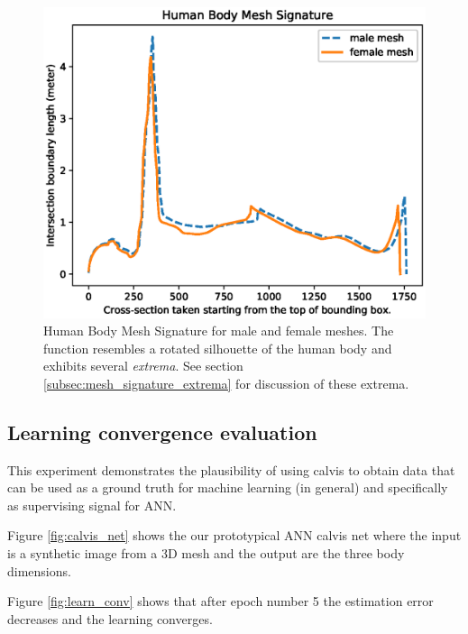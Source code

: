 \documentclass[runningheads, orivec]{llncs}
\begin{document}
\begin{figure}[h!]
	\begin{center}
		\includegraphics[width=\linewidth]{Figure_1.eps}
	\end{center}
	\caption{Human Body Mesh Signature for male and female meshes. The 
		function resembles a rotated silhouette of the human body and exhibits 
		several \textit{extrema}. See section 
		\ref{subsec:mesh_signature_extrema} for discussion of these extrema.}
	\label{fig:qualitative_eval}
\end{figure}

\subsection{Learning convergence evaluation}\label{subsec:learn_conv}
This experiment demonstrates the plausibility of using calvis to obtain data 
that can be used as a ground truth for machine learning (in general) and 
specifically as supervising signal for ANN.

Figure \ref{fig:calvis_net} shows the our prototypical ANN calvis net where the 
input is a synthetic image from a 3D mesh and the output are the three body 
dimensions.

Figure \ref{fig:learn_conv} shows that after epoch number 5 the estimation 
error decreases and the learning converges.
\end{document}

